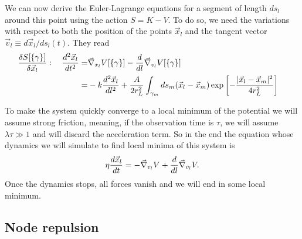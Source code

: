 \documentclass[nofootinbib,preprint,floatfix,titlepage,endfloats,superscriptaddress]{revtex4} %
\newcommand{\outNim}[1]{}
\begin{document}
\outNim{
{
\color{red} !!! Needs correction!!!}
\[K_l [\gamma_l]\equiv \int_{\gamma_l} dl \left|d^2 \vec{x}_l \over dt dl\right|^2.\]
} %
We can now derive the Euler-Lagrange equations for a segment of length $ds_l$ around this point using the action $S = K- V$. To do so, we need the variations with respect to both the position of the points $\vec{x}_l$ and the tangent vector $\vec{v}_l \equiv  d\vec{x}_l/ds_l(t)$. They read 
\begin{align} 
{\delta S[\{\gamma\}] \over \delta \vec{x}_l} : \quad {d^2 \vec{x}_l \over dt^2 }  
=&  \vec{\nabla}_{{x}_l} V[\{\gamma\}]- {d\over dl} \vec{\nabla}_{{v}_l} V[\{\gamma\}] \cr
=& -k {d^2\vec{x}_l\over dl^2} + {A\over 2 r_L^2}\int_{\gamma_m} ds_m
 (\vec{x}_l-\vec{x}_m)\exp\left[- {|\vec{x}_l-\vec{x}_m|^2 \over 4 r_L^2}\right]
\end{align}


To make the system quickly converge to a local minimum of the potential we will assume strong friction, meaning, if the observation time is $\tau$, we will assume $\lambda \tau \gg 1$ and will discard the acceleration term. So in the end the equation whose dynamics we will simulate to find local minima of this system is 
\begin{equation}
\eta {d \vec{x}_l \over dt }  
= - \vec{\nabla}_{{v}_l} V + {d\over dl} \vec{\nabla}_{{v}_l} V\label{eq:Langevin1}.
\end{equation}
Once the dynamics stops, all forces vanish and we will end in some local minimum. 

\subsection{Node repulsion}
\end{document}
